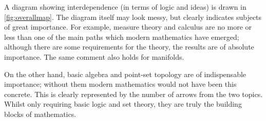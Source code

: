 A diagram showing interdependence (in terms of logic and ideas)
is drawn in \cref{fig:overallmap}.
The diagram itself may look messy,
but clearly indicates subjects of great importance.
For example, measure theory and calculus are no more or less than
one of the main paths which modern mathematics have emerged;
although there are some requirements for the theory,
the results are of absolute importance.
The same comment also holds for manifolds.

On the other hand,
basic algebra and point-set topology are of indispensable importance;
without them modern mathematics would not have been this concrete.
This is clearly represented by the number of arrows from the two topics.
Whilst only requiring basic logic and set theory,
they are truly the building blocks of mathematics.

\begin{figure}
    \centering
\end{figure}
